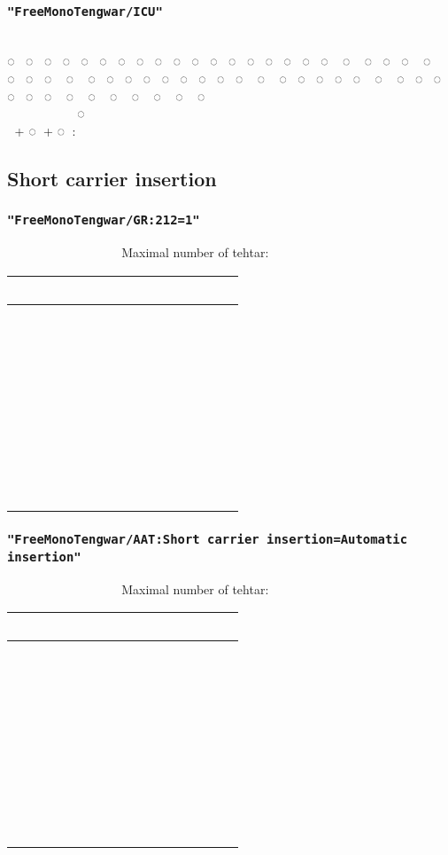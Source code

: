 \documentclass[11pt,a4paper]{article}
\begin{document}
\subsubsection*{\texttt{"FreeMonoTengwar/ICU"}}

\freeICU
                          \\
◌ ◌ ◌ ◌ ◌ ◌ ◌ ◌ ◌ ◌ ◌ ◌ ◌ ◌ ◌ ◌ ◌ ◌ ◌ ◌ ◌ ◌ ◌ ◌ ◌ ◌ ◌ ◌ ◌ ◌ ◌ ◌ ◌ ◌ ◌ ◌ ◌ ◌ ◌ ◌ ◌ ◌ ◌ ◌ ◌ ◌ ◌ ◌ ◌ ◌ ◌ ◌ ◌ ◌ ◌ ◌\\
      ◌‍ ‍ ‍ ‍ \\
 \normalfont + \freeICU ◌ \normalfont + \freeICU ◌ : 


\newpage

\subsection{Short carrier insertion}

\subsubsection*{\texttt{"FreeMonoTengwar/GR:212=1"}}

\insertGR      \normalfont Maximal number of tehtar:
\insertGR  

\newcommand{\combinationsrow}[1]{#1 & #1 & #1 & #1 & #1 & #1 & #1 & #1 & #1 \\}

\begin{tabular}{ c | c c c c c c c c}
	\combinationsrow{} \hline
	\combinationsrow{}
	\combinationsrow{}
	\combinationsrow{}
	\combinationsrow{}
	\combinationsrow{}
	\combinationsrow{}
	\combinationsrow{}
	\combinationsrow{}
\end{tabular}

\subsubsection*{\texttt{"FreeMonoTengwar/AAT:Short carrier insertion=Automatic insertion"}}

\insertAAT      \normalfont Maximal number of tehtar:
\insertAAT  

\begin{tabular}{ c | c c c c c c c c}
	\combinationsrow{} \hline
	\combinationsrow{}
	\combinationsrow{}
	\combinationsrow{}
	\combinationsrow{}
	\combinationsrow{}
	\combinationsrow{}
	\combinationsrow{}
	\combinationsrow{}
\end{tabular}
\end{document}
